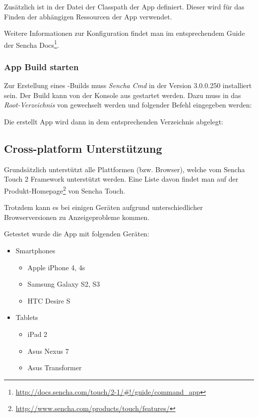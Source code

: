 Zusätzlich ist in der Datei  der Classpath der App definiert.
Dieser wird für das Finden der abhängigen Ressourcen der App verwendet.

Weitere Informationen zur Konfiguration findet man im entsprechendem Guide der Sencha Docs\footnote{\url{http://docs.sencha.com/touch/2-1/\#!/guide/command\_app}}.

\subsubsection{App Build starten}
Zur Erstellung eines \kort-Builds muss \emph{Sencha Cmd} in der Version 3.0.0.250 installiert sein.
Der Build kann von der Konsole aus gestartet werden. Dazu muss in das \emph{Root-Verzeichnis} von \kort gewechselt werden und folgender Befehl eingegeben werden:


Die erstellt App wird dann in dem entsprechenden Verzeichnis abgelegt:


\subsection{Cross-platform Unterstützung}
\label{cross-platform}
Grundsätzlich unterstützt \kort alle Plattformen (bzw. Browser), welche vom Sencha Touch 2 Framework unterstützt werden.
Eine Liste davon findet man auf der Produkt-Homepage\footnote{\url{http://www.sencha.com/products/touch/features/}} von Sencha Touch.

Trotzdem kann es bei einigen Geräten aufgrund unterschiedlicher Browserversionen zu Anzeigeprobleme kommen.

Getestet wurde die App mit folgenden Geräten:

\begin{itemize}
	\item Smartphones
	\begin{itemize}
		\item Apple iPhone 4, 4s
		\item Samsung Galaxy S2, S3
		\item HTC Desire S
	\end{itemize}
	\item Tablets
	\begin{itemize}
		\item iPad 2
		\item Asus Nexus 7
		\item Asus Transformer
	\end{itemize}
\end{itemize}

